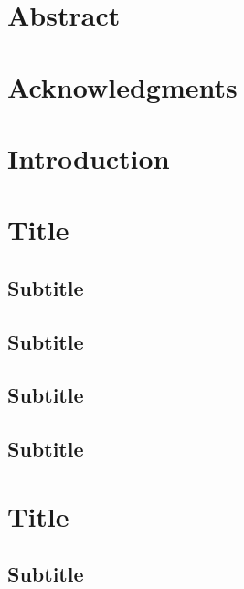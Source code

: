 \documentclass[12pt,a4paper]{article}
\renewcommand{\baselinestretch}{1.5}
\begin{document}
\section{Abstract}

\lipsum[1]

\section{Acknowledgments}

\lipsum[1]


\newpage 
\renewcommand{\baselinestretch}{1}\normalsize
\tableofcontents
\renewcommand{\baselinestretch}{1.5}\normalsize

\listoffigures
 
\listoftables

\listofappendices

\newpage

\setcounter{page}{1}


\section{Introduction}


\lipsum[1]

\newpage
\section{Title}
\subsection{Subtitle}
\lipsum[1]
\subsection{Subtitle}
\lipsum[1]
\subsection{Subtitle}
\lipsum[1]
\subsection{Subtitle}
\lipsum[1]
\newpage
\section{Title}
\subsection{Subtitle}
\lipsum[1]
\end{document}
